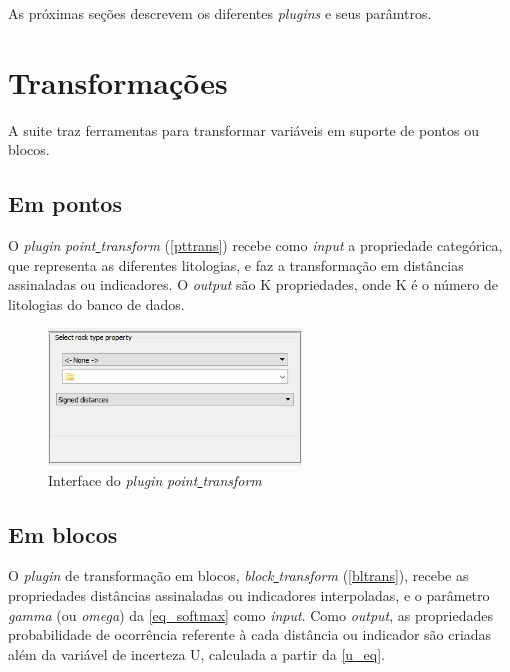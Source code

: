 As próximas seções descrevem os diferentes \textit{plugins} e seus parâmtros.

\section{Transformações}

A suite traz ferramentas para transformar variáveis em suporte de pontos ou blocos.

\subsection{Em pontos}\label{pttrans_sec}

O \textit{plugin} \textit{point\underline{ }transform} (\autoref{pttrans}) recebe como \textit{input} a propriedade categórica, que representa as diferentes litologias, e faz a transformação em distâncias assinaladas ou indicadores. O \textit{output} são K propriedades, onde K é o número de litologias do banco de dados.

\begin{figure}[H]
	\caption{\label{pttrans}Interface do \textit{plugin} \textit{point\underline{ }transform}}
	\centering
		\includegraphics[width=0.6\textwidth]{apendice/imagens/point_transform.PNG}
\end{figure}

\subsection{Em blocos}

O \textit{plugin} de transformação em blocos, \textit{block\underline{ }transform} (\autoref{bltrans}), recebe as propriedades distâncias assinaladas ou indicadores interpoladas, e o parâmetro \textit{gamma} (ou \textit{omega}) da \autoref{eq_softmax} como \textit{input}. Como \textit{output}, as propriedades probabilidade de ocorrência referente à cada distância ou indicador são criadas além da variável de incerteza U, calculada a partir da \autoref{u_eq}.


